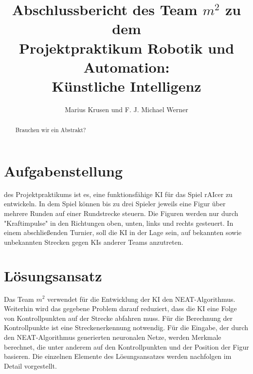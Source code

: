\documentclass[11pt,final,journal,a4paper,towside,towcolumn]{IEEEtran}
\begin{document}
\begin{acronym}
\end{acronym}
	
\title{Abschlussbericht des Team $m^2$ zu dem \\Projektpraktikum Robotik und Automation:\\Künstliche Intelligenz}
\author{Marius Krusen und F. J. Michael Werner}
\maketitle

\begin{abstract}
Brauchen wir ein Abstrakt?
\end{abstract}

\section{Aufgabenstellung}
 des Projektpraktikums ist es, eine funktionsfähige  \ac{KI} für das Spiel rAIcer zu entwickeln. In dem Spiel können bis zu drei Spieler jeweils eine Figur über mehrere Runden auf einer Rundstrecke steuern. Die Figuren werden nur durch "Kraftimpulse" in den Richtungen oben, unten, links und rechts gesteuert. In einem abschließenden Turnier, soll die \ac{KI} in der Lage sein, auf bekannten sowie unbekannten Strecken gegen \acp{KI} anderer Teams anzutreten.

\section{Lösungsansatz}
Das Team $m^2$ verwendet für die Entwicklung der \ac{KI} den \ac{NEAT}-Algorithmus. Weiterhin wird das gegebene Problem darauf reduziert, dass die \ac{KI} eine Folge von Kontrollpunkten auf der Strecke abfahren muss. Für die Berechnung der Kontrollpunkte ist eine Streckenerkennung notwendig. Für die Eingabe, der durch den \ac{NEAT}-Algorithmus generierten neuronalen Netze, werden Merkmale berechnet, die unter anderem auf den Kontrollpunkten und der Position der Figur basieren. Die einzelnen Elemente des Lösungsansatzes werden nachfolgen im Detail vorgestellt.
\end{document}

